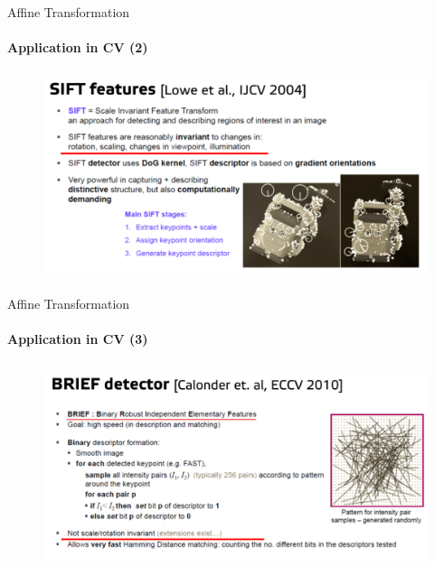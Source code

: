 \documentclass[aspectratio=169]{beamer}
\begin{document}
\begin{frame}[t]{Affine Transformation}
\framesubtitle{Application in CV (2)}
    \vspace{-0.6cm}
    \begin{figure}[H]
        \centering\includegraphics[height=6cm,width=1\textwidth,keepaspectratio]{sift.png}
        \label{fig:sift.png}
    \end{figure}
\end{frame}

\begin{frame}[t]{Affine Transformation}
    \framesubtitle{Application in CV (3)}
        \vspace{-0.6cm}
        \begin{figure}[H]
            \centering\includegraphics[height=6cm,width=1\textwidth,keepaspectratio]{brief.png}
            \label{fig:brief.png}
        \end{figure}
    \end{frame}
\end{document}
